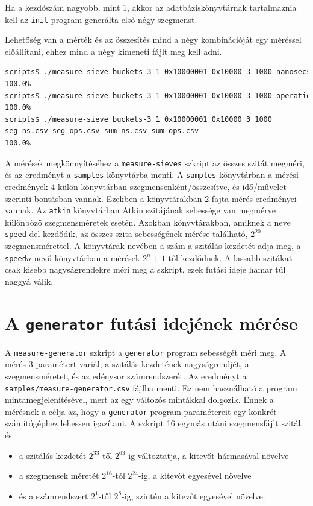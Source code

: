 Ha a kezdőszám nagyobb, mint 1, akkor az adatbáziskönyvtárnak tartalmaznia kell az \texttt{init} program generálta első négy szegmenst.

Lehetőség van a mérték és az összesítés mind a négy kombinációját egy méréssel előállítani, ehhez mind a négy kimeneti fájlt meg kell adni.

\begin{lstlisting}[language=bash]
scripts$ ./measure-sieve buckets-3 1 0x10000001 0x10000 3 1000 nanosecs sum out1.csv
100.0%
scripts$ ./measure-sieve buckets-3 1 0x10000001 0x10000 3 1000 operations segment out2.csv
100.0%
scripts$ ./measure-sieve buckets-3 1 0x10000001 0x10000 3 1000
seg-ns.csv seg-ops.csv sum-ns.csv sum-ops.csv
100.0%
\end{lstlisting}

A mérések megkönnyítéséhez a \texttt{measure-sieves} szkript az összes szitát megméri, és az eredményt a \texttt{samples} könyvtárba menti.
A \texttt{samples} könyvtárban a mérési eredmények 4 külön könyvtárban szegmensenként/összesítve, és idő/művelet szerinti bontásban vannak.
Ezekben a könyvtárakban 2 fajta mérés eredményei vannak.
Az \texttt{atkin} könyvtárban Atkin szitájának sebessége van megmérve különböző szegmensméretek esetén.
Azokban könyvtárakban, amiknek a neve \texttt{speed}-del kezdődik, az összes szita sebességének mérése található, $2^{20}$ szegmensmérettel.
A könyvtárak nevében a szám a szitálás kezdetét adja meg, a \texttt{speed}$n$ nevű könyvtárban a mérések $2^n+1$-től kezdődnek.
A lassabb szitákat csak kisebb nagyságrendekre méri meg a szkript, ezek futási ideje hamar túl naggyá válik.

\section{A \texttt{generator} futási idejének mérése}

A \texttt{measure-generator} szkript a \texttt{generator} program sebességét méri meg.
A mérés 3 paramétert variál, a szitálás kezdetének nagyságrendjét, a szegmensméretet, és az edénysor számrendszerét.
Az eredményt a \texttt{samples/measure-generator.csv} fájlba menti.
Ez nem használható a program mintamegjelenítésével, mert az egy változós mintákkal dolgozik.
Ennek a mérésnek a célja az, hogy a \texttt{generator} program paramétereit egy konkrét számítógéphez lehessen igazítani.
A szkript 16 egymás utáni szegmensfájlt szitál, és
\begin{itemize}
\item a szitálás kezdetét $2^{33}$-től $2^{63}$-ig változtatja, a kitevőt hármasával növelve
\item a szegmensek méretét $2^{16}$-tól $2^{24}$-ig, a kitevőt egyesével növelve
\item és a számrendszert $2^1$-től $2^8$-ig, szintén a kitevőt egyesével növelve.
\end{itemize}

